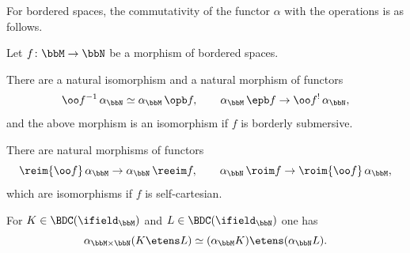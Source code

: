 For bordered spaces, the commutativity of the functor $\alpha$ with the operations is as follows.

\begin{lemma}\label{lem:alphaop}
Let $f\colon\bbM\to\bbN$ be a morphism of bordered spaces.
\begin{enumeratei}
\item\label{lem:alphaopi}
There are a natural isomorphism and a natural morphism of functors
\[
\oo f{}^{-1} \, \alpha_{\bbN} \simeq \alpha_{\bbM} \, \opb f , \qquad
\alpha_{\bbM} \, \epb f \to \oo f{}^! \, \alpha_{\bbN} ,
\]
and the above morphism is an isomorphism if $f$ is borderly submersive.
\item\label{lem:alphaopii}
There are natural morphisms of functors
\[
\reim {\oo f} \, \alpha_{\bbM} \to \alpha_{\bbN} \, \reeim f, \qquad
\alpha_{\bbN} \, \roim f \to \roim {\oo f} \, \alpha_{\bbM},
\]
which are isomorphisms if $f$ is self-cartesian.
\item\label{lem:alphaopiii}
For $K\in\BDC(\ifield_\bbM)$ and $L\in\BDC(\ifield_\bbN)$ one has
\[
\alpha_{\bbM\times\bbN}(K\etens L) \simeq (\alpha_\bbM K)\etens(\alpha_\bbN L).
\]
\end{enumeratei}
\end{lemma}

